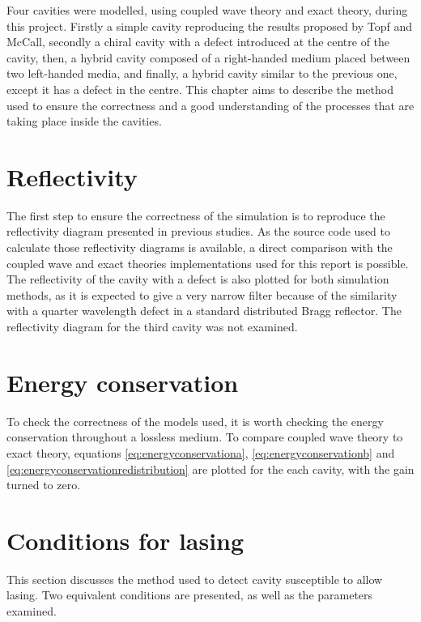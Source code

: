 Four cavities were modelled, using coupled wave theory and exact theory, during this project. Firstly a simple cavity reproducing the results proposed by Topf and McCall\cite{topf_modes_2014}, secondly a chiral cavity with a defect introduced at the centre of the cavity, then, a hybrid cavity composed of a right-handed medium placed between two left-handed media, and finally, a hybrid cavity similar to the previous one, except it has a defect in the centre. This chapter aims to describe the method used to ensure the correctness and a good understanding of the processes that are taking place inside the cavities.

\section{Reflectivity}

The first step to ensure the correctness of the simulation is to reproduce the reflectivity diagram presented in previous studies\cite{mccall_simplified_2009}. As the source code used to calculate those reflectivity diagrams is available, a direct comparison with the coupled wave and exact theories implementations used for this report is possible. The reflectivity of the cavity with a defect is also plotted for both simulation methods, as it is expected to give a very narrow filter because of the similarity with a quarter wavelength defect in a standard distributed Bragg reflector\cite{mccall_photonics_2020}. The reflectivity diagram for the third cavity was not examined.

\section{Energy conservation}

To check the correctness of the models used, it is worth checking the energy conservation throughout a lossless medium. To compare coupled wave theory to exact theory, equations \ref{eq:energyconservationa}, \ref{eq:energyconservationb} and \ref{eq:energyconservationredistribution} are plotted for the each cavity, with the gain turned to zero.

\section{Conditions for lasing}
This section discusses the method used to detect cavity susceptible to allow lasing. Two equivalent conditions are presented, as well as the parameters examined.

